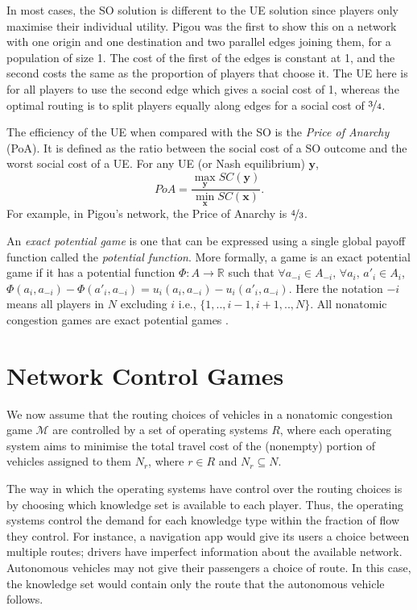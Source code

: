 \documentclass{article}
\begin{document}
	In most cases, the SO solution is different to the UE solution since players only maximise their individual utility. Pigou \cite{Pigou1920} was the first to show this on a network with one origin and one destination and two parallel edges joining them, for a population of size 1. The cost of the first of the edges is constant at 1, and the second costs the same as the proportion of players that choose it. The UE here is for all players to use the second edge which gives a social cost of 1, whereas the optimal routing is to split players equally along edges for a social cost of $\nicefrac{3}{4}$.
	
	 The efficiency of the UE when compared with the SO is the \textit{Price of Anarchy} (PoA). It is defined as the ratio between the social cost of a SO outcome and the worst social cost of a UE. For any UE (or Nash equilibrium) $\bm{y}$,
	\[PoA = \frac{\max_{\bm{y}} SC(\bm{y})}{\min_{\bm{x}} SC(\bm{x})}.\] %
	For example, in Pigou's network, the Price of Anarchy is $\nicefrac{4}{3}$.
	
	An \textit{exact potential game} is one that can be expressed using a single global payoff function called the {\em potential function}. More formally, a game is an exact potential game if it has a potential function $\Phi:A \rightarrow \mathds{R}$ such that $\forall a_{-i}\in A_{-i}, \, \forall a_i,\, a'_i \in A_i$, $\Phi(a_i,a_{-i})- \Phi(a'_i,a_{-i}) = u_i(a_i,a_{-i})-u_i (a'_i,a_{-i})$. Here the notation $-i$ means all players in $N$ excluding $i$ i.e., $\{1,..,i-1,i+1,..,N\}$.  All nonatomic congestion games are exact potential games  \cite{Monderer1996}.
	
\section{Network Control Games} \label{sec:ncg}
    We now assume that the routing choices of vehicles in a nonatomic congestion game $\mathcal{M}$ are controlled by a set of operating systems $R$, where each operating system aims to minimise the total travel cost of the (nonempty) portion of vehicles assigned to them $N_r$, where $r \in R$ and $N_r \subseteq N$. 
    
     The way in which the operating systems have control over the routing choices is by choosing which knowledge set is available to each player. Thus, the operating systems control the demand for each knowledge type within the fraction of flow they control. For instance, a navigation app would give its users a choice between multiple routes; drivers have imperfect information about the available network. Autonomous vehicles may not give their passengers a choice of route. In this case, the knowledge set would contain only the route that the autonomous vehicle follows. 
\end{document}
